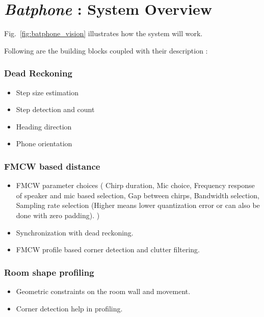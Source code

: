 \section{\emph{Batphone} : System Overview}\label{sec:overview}

Fig.~\ref{fig:batphone_vision} illustrates how the system will work.
\begin{figure}[h!t]
\end{figure}

Following are the building blocks coupled with their description :
\subsubsection{Dead Reckoning}
\begin{itemize}
\item Step size estimation
\item Step detection and count
\item Heading direction
\item Phone orientation
\end{itemize}

\subsubsection{FMCW based distance}
\begin{itemize}
\item FMCW parameter choices ( Chirp duration, Mic choice, Frequency response of speaker and mic based selection, Gap between chirps, Bandwidth selection, Sampling rate selection (Higher means lower quantization error or can also be done with zero padding). )
\item Synchronization with dead reckoning.
\item FMCW profile based corner detection and clutter filtering.
\end{itemize}

\subsubsection{Room shape profiling}
\begin{itemize}
\item Geometric constraints on the room wall and movement.
\item Corner detection help in profiling.
\end{itemize}